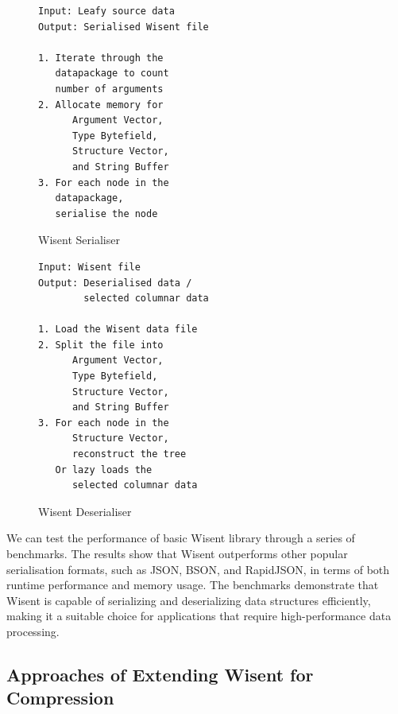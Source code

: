 \begin{figure}[ht]
\centering
\begin{minipage}[t]{0.47\textwidth}
\begin{tcolorbox}[pseudocodebox, title=Mechanism: Wisent Serialiser]
\begin{verbatim}
Input: Leafy source data
Output: Serialised Wisent file

1. Iterate through the 
   datapackage to count 
   number of arguments
2. Allocate memory for 
      Argument Vector, 
      Type Bytefield, 
      Structure Vector, 
      and String Buffer
3. For each node in the
   datapackage, 
   serialise the node
\end{verbatim}
\end{tcolorbox}
\caption{Wisent Serialiser}
\label{fig:serialiser}
\end{minipage}%
\hfill
\begin{minipage}[t]{0.47\textwidth}
\begin{tcolorbox}[pseudocodebox, title=Mechanism: Wisent Deserialiser]
\begin{verbatim}
Input: Wisent file
Output: Deserialised data / 
        selected columnar data

1. Load the Wisent data file
2. Split the file into 
      Argument Vector, 
      Type Bytefield, 
      Structure Vector, 
      and String Buffer
3. For each node in the 
      Structure Vector, 
      reconstruct the tree
   Or lazy loads the 
      selected columnar data
\end{verbatim}
\end{tcolorbox}
\caption{Wisent Deserialiser}
\label{fig:deserialiser}
\end{minipage}
\end{figure}

We can test the performance of basic Wisent library through a series of benchmarks. The results show that Wisent outperforms other popular serialisation formats, such as JSON, BSON, and RapidJSON, in terms of both runtime performance and memory usage. The benchmarks demonstrate that Wisent is capable of serializing and deserializing data structures efficiently, making it a suitable choice for applications that require high-performance data processing.



\subsection{Approaches of Extending Wisent for Compression}

